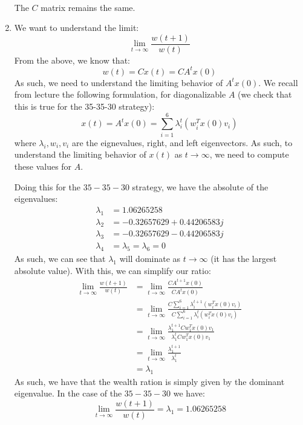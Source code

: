 \documentclass[12pt]{exam}
\begin{document}
\begin{questions}
\begin{solution}
\begin{enumerate}[label=(\alph*)]
\begin{align*}
      \end{align*}
      The $C$ matrix remains the same.
      \item We want to understand the limit:
      \[
        \lim_{t \to \infty} \frac{w(t+1)}{w(t)}
      \]
      From the above, we know that:
      \[
        w(t) = Cx(t) = CA^tx(0)
      \]
      As such, we need to understand the limiting behavior of $A^tx(0)$. We recall from lecture the following formulation, for diagonalizable $A$ (we check that this is true for the 35-35-30 strategy):
      \[
        x(t) = A^tx(0) = \sum_{i=1}^6 \lambda_i^t(w_i^Tx(0)v_i) \tag{$A$ is diagonalize for 35-35-30 strategy}
      \]
      where $\lambda_i, w_i, v_i$ are the eignevalues, right, and left eigenvectors. As such, to understand the limiting behavior of $x(t)$ as $t \to \infty$, we need to compute these values for $A$.

      Doing this for the $35-35-30$ strategy, we have the absolute of the eigenvalues:
      \begin{align*}
        \lambda_1 &= 1.06265258 \\
        \lambda_2 &= -0.32657629 + 0.44206583j \\
        \lambda_3 &=  -0.32657629 - 0.44206583j \\
        \lambda_4 &= \lambda_5 = \lambda_6 = 0 
      \end{align*}
      As such, we can see that $\lambda_1$ will dominate as $t \to \infty$ (it has the largest absolute value). With this, we can simplify our ratio:
      \begin{align*}
        \lim_{t \to \infty} \frac{w(t+1)}{w(t)} &= \lim_{t \to \infty} \frac{CA^{t+1}x(0)}{CA^tx(0)} \\
        &= \lim_{t \to \infty} \frac{C \sum_{i=1}^6 \lambda_i^{t+1}(w_i^Tx(0)v_i)}{C\sum_{i=1}^6 \lambda_i^t(w_i^Tx(0)v_i)} \tag{Subtituting $A^tx(0)$} \\
        &=\lim_{t \to \infty} \frac{\lambda_1^{t+1}Cw_1^Tx(0)v_1 }{\lambda_1^{t}Cw_1^Tx(0)v_1}  \tag{As $t \to \infty$, only $\lambda_1$ survives} \\
        &= \lim_{t \to \infty} \frac{\lambda_1^{t+1}}{\lambda_1^{t}} \tag{Factor out and cancel values not dependent on $t$} \\
        &= \lambda_1
      \end{align*}
      As such, we have that the wealth ration is simply given by the dominant eigenvalue. In the case of the $35-35-30$ we have:
      \[
        \lim_{t \to \infty} \frac{w(t+1)}{w(t)} = \lambda_1 = 1.06265258 
      \]


\end{enumerate}
\end{solution}
\end{questions}
\end{document}
